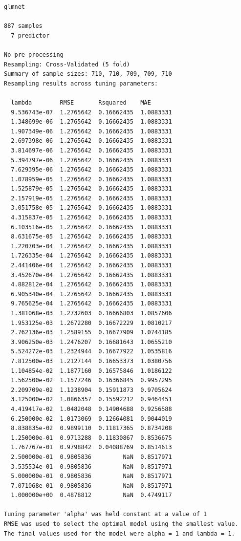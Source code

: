 \documentclass[
  letterpaper,
  DIV=11,
  numbers=noendperiod]{scrartcl}
\begin{document}
\begin{verbatim}
glmnet 

887 samples
  7 predictor

No pre-processing
Resampling: Cross-Validated (5 fold) 
Summary of sample sizes: 710, 710, 709, 709, 710 
Resampling results across tuning parameters:

  lambda        RMSE       Rsquared    MAE      
  9.536743e-07  1.2765642  0.16662435  1.0883331
  1.348699e-06  1.2765642  0.16662435  1.0883331
  1.907349e-06  1.2765642  0.16662435  1.0883331
  2.697398e-06  1.2765642  0.16662435  1.0883331
  3.814697e-06  1.2765642  0.16662435  1.0883331
  5.394797e-06  1.2765642  0.16662435  1.0883331
  7.629395e-06  1.2765642  0.16662435  1.0883331
  1.078959e-05  1.2765642  0.16662435  1.0883331
  1.525879e-05  1.2765642  0.16662435  1.0883331
  2.157919e-05  1.2765642  0.16662435  1.0883331
  3.051758e-05  1.2765642  0.16662435  1.0883331
  4.315837e-05  1.2765642  0.16662435  1.0883331
  6.103516e-05  1.2765642  0.16662435  1.0883331
  8.631675e-05  1.2765642  0.16662435  1.0883331
  1.220703e-04  1.2765642  0.16662435  1.0883331
  1.726335e-04  1.2765642  0.16662435  1.0883331
  2.441406e-04  1.2765642  0.16662435  1.0883331
  3.452670e-04  1.2765642  0.16662435  1.0883331
  4.882812e-04  1.2765642  0.16662435  1.0883331
  6.905340e-04  1.2765642  0.16662435  1.0883331
  9.765625e-04  1.2765642  0.16662435  1.0883331
  1.381068e-03  1.2732603  0.16666803  1.0857606
  1.953125e-03  1.2672280  0.16672229  1.0810217
  2.762136e-03  1.2589155  0.16677909  1.0744185
  3.906250e-03  1.2476207  0.16681643  1.0655210
  5.524272e-03  1.2324944  0.16677922  1.0535816
  7.812500e-03  1.2127144  0.16653373  1.0380756
  1.104854e-02  1.1877160  0.16575846  1.0186122
  1.562500e-02  1.1577246  0.16366845  0.9957295
  2.209709e-02  1.1238904  0.15911873  0.9705624
  3.125000e-02  1.0866357  0.15592212  0.9464451
  4.419417e-02  1.0482048  0.14904688  0.9256588
  6.250000e-02  1.0173069  0.12664081  0.9044019
  8.838835e-02  0.9899110  0.11817365  0.8734208
  1.250000e-01  0.9713288  0.11830867  0.8536675
  1.767767e-01  0.9798842  0.04088769  0.8514613
  2.500000e-01  0.9805836         NaN  0.8517971
  3.535534e-01  0.9805836         NaN  0.8517971
  5.000000e-01  0.9805836         NaN  0.8517971
  7.071068e-01  0.9805836         NaN  0.8517971
  1.000000e+00  0.4878812         NaN  0.4749117

Tuning parameter 'alpha' was held constant at a value of 1
RMSE was used to select the optimal model using the smallest value.
The final values used for the model were alpha = 1 and lambda = 1.
\end{verbatim}
\end{document}
